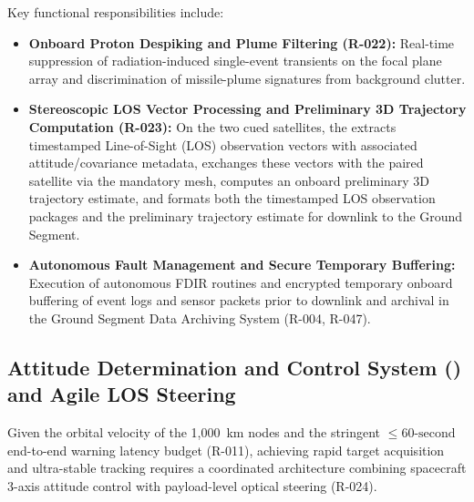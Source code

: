 Key  functional responsibilities include:
\begin{itemize}
    \item \textbf{Onboard Proton Despiking and Plume Filtering (R-022):} Real-time suppression of radiation-induced single-event transients on the focal plane array and discrimination of missile-plume signatures from background clutter.
    \item \textbf{Stereoscopic LOS Vector Processing and Preliminary 3D Trajectory Computation (R-023):} On the two cued  satellites, the  extracts timestamped Line-of-Sight (LOS) observation vectors with associated attitude/covariance metadata, exchanges these vectors with the paired  satellite via the mandatory  mesh, computes an onboard preliminary 3D trajectory estimate, and formats both the timestamped LOS observation packages and the preliminary trajectory estimate for downlink to the Ground Segment.
    \item \textbf{Autonomous Fault Management and Secure Temporary Buffering:} Execution of autonomous FDIR routines and encrypted temporary onboard buffering of event logs and sensor packets prior to downlink and archival in the Ground Segment Data Archiving System (R-004, R-047).
\end{itemize}

\subsection[Attitude Determination and Control System (ADCS) and Agile LOS Steering]{Attitude Determination and Control System () and Agile LOS Steering}
Given the orbital velocity of the 1,000~km  nodes and the stringent $\le 60\text{-second}$ end-to-end warning latency budget (R-011), achieving rapid target acquisition and ultra-stable tracking requires a coordinated architecture combining spacecraft 3-axis attitude control with payload-level optical steering (R-024).

